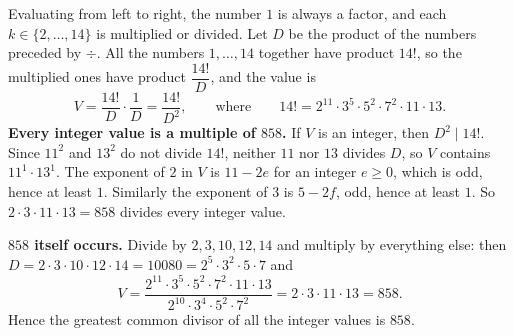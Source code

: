 Evaluating from left to right, the number $1$ is always a factor, and each $k\in\{2,\dots,14\}$ is multiplied or divided. Let $D$ be the product of the numbers preceded by $\div$. All the numbers $1,\dots,14$ together have product $14!$, so the multiplied ones have product $\dfrac{14!}{D}$, and the value is
\[V=\dfrac{14!}{D}\cdot\dfrac1D=\dfrac{14!}{D^2},\qquad\text{where}\qquad14!=2^{11}\cdot3^5\cdot5^2\cdot7^2\cdot11\cdot13.\]
\textbf{Every integer value is a multiple of $858$.} If $V$ is an integer, then $D^2\mid14!$. Since $11^2$ and $13^2$ do not divide $14!$, neither $11$ nor $13$ divides $D$, so $V$ contains $11^1\cdot13^1$. The exponent of $2$ in $V$ is $11-2e$ for an integer $e\ge0$, which is odd, hence at least $1$. Similarly the exponent of $3$ is $5-2f$, odd, hence at least $1$. So $2\cdot3\cdot11\cdot13=858$ divides every integer value.

\textbf{$858$ itself occurs.} Divide by $2,3,10,12,14$ and multiply by everything else: then $D=2\cdot3\cdot10\cdot12\cdot14=10080=2^5\cdot3^2\cdot5\cdot7$ and
\[V=\dfrac{2^{11}\cdot3^5\cdot5^2\cdot7^2\cdot11\cdot13}{2^{10}\cdot3^4\cdot5^2\cdot7^2}=2\cdot3\cdot11\cdot13=858.\]
Hence the greatest common divisor of all the integer values is $\boxed{858}$.
